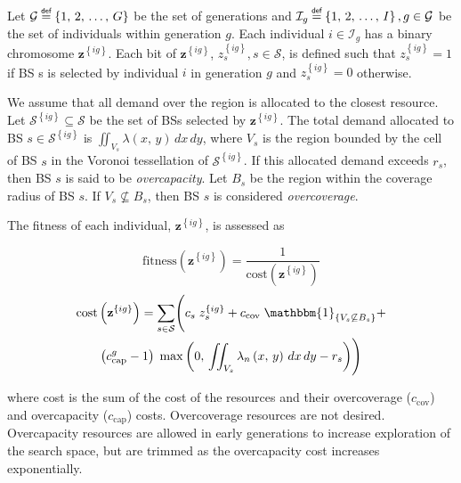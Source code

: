 \documentclass[conference]{IEEEtran}
\newcommand\defeq{\mathrel{\overset{\makebox[0pt]{\mbox{\normalfont\tiny\sffamily def}}}{=}}}
\newcommand{\ind}[1]{\mathbbm{1}_{\left\{ #1 \right\}}}
\begin{document}
Let $\mathcal{G} \defeq \left\{1,\, 2,\, \ldots,\, G\right\}$ be the set of generations and $\mathcal{I}_g \defeq \left\{1,\, 2,\, \ldots,\, I\right\}, g \in \mathcal{G}$ be the set of individuals within generation $g$.  Each individual $i \in \mathcal{I}_g$ has a binary chromosome $\textbf{z}^{\left\{ ig \right\}}$.  Each bit of $\textbf{z}^{\left\{ ig \right\}}$, $z_s^{\left\{ ig \right\}}, s \in \mathcal{S}$, is defined such that $z_s^{\left\{ ig \right\}} = 1$ if BS s is selected by individual $i$ in generation $g$ and $z_s^{\left\{ ig \right\}} = 0$ otherwise.

We assume that all demand over the region is allocated to the closest resource.  Let $\mathcal{S}^{\left\{ ig \right\}} \subseteq \mathcal{S}$ be the set of BSs selected by $\textbf{z}^{\left\{ ig \right\}}$.  The total demand allocated to BS $s \in \mathcal{S}^{\left\{ ig \right\}}$ is $\iint_{V_s} \lambda\left( x,\, y \right) \,dx \,dy$, where $V_s$ is the region bounded by the cell of BS $s$ in the Voronoi tessellation of $\mathcal{S}^{\left\{ ig \right\}}$.  If this allocated demand exceeds $r_s$, then BS $s$ is said to be \emph{overcapacity}.  Let $B_s$ be the region within the coverage radius of BS $s$.  If $V_s \not\subseteq B_s$, then BS $s$ is considered \emph{overcoverage}.

The fitness of each individual, $\textbf{z}^{\left\{ ig \right\}}$, is assessed as

\begin{equation} \label{eq:GAFit}
\text{fitness}\left( \textbf{z}^{\left\{ ig \right\}} \right) = \frac{1}{\text{cost}\left( \textbf{z}^{\left\{ ig \right\}} \right)}
\end{equation}
\begin{multline} \label{eq:GACost}
\mathrm{cost}\left( \textbf{z}^{\left\{ ig \right\}} \right) = \sum_{s \in \mathcal{S}} \Biggl( c_s \; z_s^{\left\{ ig \right\}} + c_\text{cov} \; \ind{V_s \not\subseteq B_s} + \\ \left( c_\text{cap}^g - 1 \right) \; \max\left( 0,\, \iint_{V_s} \lambda_n\left( x,\, y \right)\, dx\, dy - r_s \right) \Biggr)
\end{multline}

\noindent where cost is the sum of the cost of the resources and their overcoverage ($c_\text{cov}$) and overcapacity ($c_\text{cap}$) costs.  Overcoverage resources are not desired.  Overcapacity resources are allowed in early generations to increase exploration of the search space, but are trimmed as the overcapacity cost increases exponentially.
\end{document}
